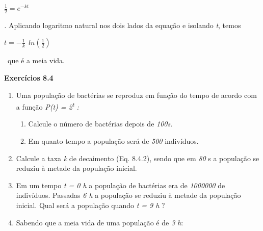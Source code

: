 \documentclass[12pt]{article}
\begin{document}
\vspace{\baselineskip}
\begin{adjustwidth}{1.57in}{0.0in}
 \( \frac{1}{2}=e^{-kt} \) {\fontsize{14pt}{16.8pt}\selectfont \textit{. }Aplicando logaritmo natural nos dois lados da equação e isolando \textit{t}, temos\textit{ }\par}\par

\end{adjustwidth}

{\fontsize{14pt}{16.8pt}\selectfont \textit{ }\par}\par

 \( t=-\frac{1}{k}~~ ln  \left( \frac{ 1}{2} \right)  \) {\fontsize{14pt}{16.8pt}\selectfont \  que é a meia vida.\par}\par


\vspace{\baselineskip}
\textbf{Exercícios 8.4}\par

\begin{enumerate}
	\item Uma população de bactérias se reproduz em função do tempo de acordo com a função  \textit{P(t) = 2\textsuperscript{t} :}\par

\begin{enumerate}
	\item Calcule o número de bactérias depois de \textit{100s}. \par

	\item Em quanto tempo a população será de \textit{500} indivíduos.
\end{enumerate}\par

	\item Calcule a taxa \textit{k} de decaimento (Eq. 8.4.2), sendo que em \textit{80} s a população se reduziu à metade da população inicial.\par

	\item Em um tempo \textit{t = 0 h} a população de bactérias era de \textit{1000000} de indivíduos. Passadas \textit{6 h} a população se reduziu à metade da população inicial. Qual será a população quando \textit{t = 9 h} ?\par

	\item Sabendo que a meia vida de uma população é de \textit{3 h}:
\end{enumerate}\par
\end{document}
